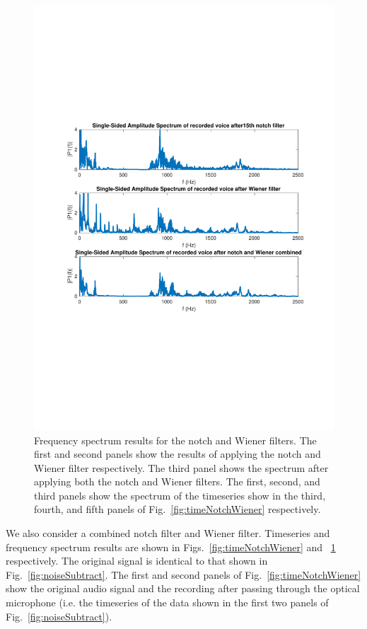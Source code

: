 \documentclass[paper-main.tex]{subfiles}
\begin{document}
\begin{figure}
\begin{center}
\includegraphics[width=\textwidth,trim={0cm 8.2cm 0 8cm},clip]{figures/freqNotchWiener.pdf}
\end{center}
\caption{\label{fig:freqNotchWiener}
Frequency spectrum results for the notch and Wiener filters. 
The first and second panels show the results of applying the notch and Wiener filter respectively.
The third panel shows the spectrum after applying both the notch and Wiener filters. 
The first, second, and third panels show the spectrum of the timeseries show in the third, fourth, and fifth panels of Fig.~\ref{fig:timeNotchWiener} respectively. 
}
\end{figure}

We also consider a combined notch filter and Wiener filter.
Timeseries and frequency spectrum results are shown in Figs.~\ref{fig:timeNotchWiener} and ~\ref{fig:freqNotchWiener} respectively. 
The original signal is identical to that shown in Fig.~\ref{fig:noiseSubtract}.
The first and second panels of Fig.~\ref{fig:timeNotchWiener} show the original audio signal and the recording after passing through the optical microphone (i.e. the timeseries of the data shown in the first two panels of Fig.~\ref{fig:noiseSubtract}). 
\end{document}
